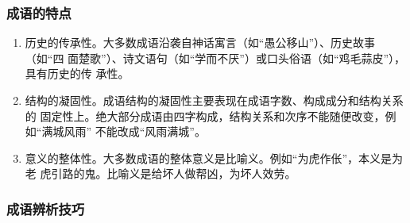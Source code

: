 \documentclass[final,oneside]{ctexbook}
\begin{document}
\subsubsection{成语的特点}

\begin{enumerate}
  \item 历史的传承性。大多数成语沿袭自神话寓言（如“愚公移山”）、历史故事（如“四
    面楚歌”）、诗文语句（如“学而不厌”）或口头俗语（如“鸡毛蒜皮”），具有历史的传
    承性。

  \item 结构的凝固性。成语结构的凝固性主要表现在成语字数、构成成分和结构关系的
    固定性上。绝大部分成语由四字构成，结构关系和次序不能随便改变，例如“满城风雨”
    不能改成“风雨满城”。

  \item 意义的整体性。大多数成语的整体意义是比喻义。例如“为虎作伥”，本义是为老
    虎引路的鬼。比喻义是给坏人做帮凶，为坏人效劳。
\end{enumerate}

\subsubsection{成语辨析技巧}
\end{document}
